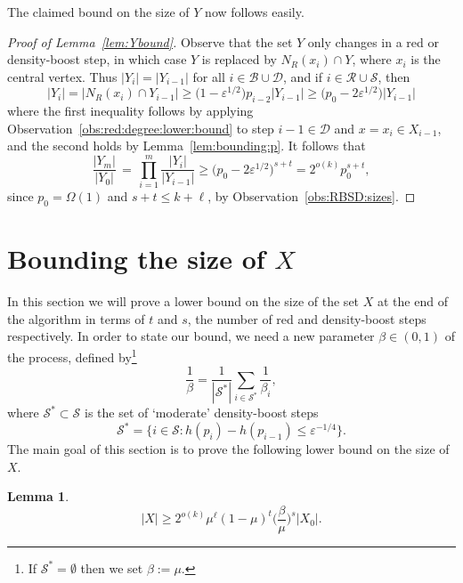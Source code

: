 \documentclass[12pt,reqno]{amsart}
\newtheorem{lemma}[theorem]{Lemma}
\theoremstyle{definition}
\theoremstyle{remark}
\newcommand\cB{\mathcal{B}}
\def\cS{\mathcal{S}}
\newcommand\eps{\varepsilon}
\renewcommand{\le}{\leqslant}
\renewcommand{\ge}{\geqslant}
\def\eps{\varepsilon}
\def\cD{\mathcal{D}}
\def\cR{\mathcal{R}}
\def\cB{\mathcal{B}}
\begin{document}
The claimed bound on the size of $Y$ now follows easily. 

\begin{proof}[Proof of Lemma~\ref{lem:Ybound}]
Observe that the set $Y$ only changes in a red or density-boost step, in which case $Y$ is replaced by $N_R(x_i) \cap Y$, where $x_i$ is the central vertex. Thus $|Y_i| = |Y_{i-1}|$ for all $i \in \cB \cup \cD$, and if $i \in \cR \cup \cS$, then
$$|Y_i| = |N_R(x_i) \cap Y_{i-1}| \ge \big( 1 - \eps^{1/2} \big) p_{i-2} |Y_{i-1}| \ge \big( p_0 - 2\eps^{1/2} \big) |Y_{i-1}|$$
where the first inequality follows by applying Observation~\ref{obs:red:degree:lower:bound} to step $i - 1 \in \cD$ and $x = x_i \in X_{i-1}$, and the second holds by Lemma~\ref{lem:bounding:p}. It follows that
$$\frac{|Y_m|}{|Y_0|} \, = \, \prod_{i = 1}^m \frac{|Y_i|}{|Y_{i-1}|} \ge \big( p_0 - 2\eps^{1/2} \big)^{s+t} = 2^{o(k)} p_0^{s+t},$$
since $p_0 = \Omega(1)$ and $s+t \le k+\ell$, by Observation~\ref{obs:RBSD:sizes}. 
\end{proof}








\section{Bounding the size of $X$}\label{X:sec}

In this section we will prove a lower bound on the size of the set $X$ at the end of the algorithm in terms of $t$ and $s$, the number of red and density-boost steps respectively. In order to state our bound, we need a new parameter $\beta \in (0,1)$ of the process, defined by\footnote{If $\cS^* = \emptyset$ then we set $\beta := \mu$.}
\begin{equation}\label{def:beta}
\frac{1}{\beta} = \frac{1}{|\cS^*|} \sum_{i \in \cS^*} \frac{1}{\beta_i},
\end{equation}
where $\cS^* \subset \cS$ is the set of `moderate' density-boost steps
\begin{equation}\label{def:Sstar}
\cS^* = \big\{ i \in \cS : h(p_i) - h(p_{i-1}) \le \eps^{-1/4} \big\}.
\end{equation}
The main goal of this section is to prove the following lower bound on the size of $X$. 

\begin{lemma}\label{lem:Xbound}
\begin{equation}\label{eq:Xbound}
|X| \ge 2^{o(k)} \mu^\ell (1 - \mu)^t \bigg( \frac{\beta}{\mu} \bigg)^s |X_0|.
\end{equation}
\end{lemma}
\end{document}
